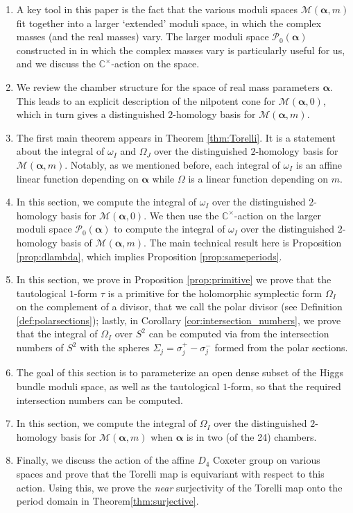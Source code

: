 \documentclass[12pt,letterpaper,reqno]{amsart}
\def\mathbf#1{#1}%
\theoremstyle{remark}
\theoremstyle{definition}
\numberwithin{thm}{section}
\numberwithin{equation}{section}
\numberwithin{figure}{section}
\newcommand{\C}{\ensuremath{\mathbb C}}
\newcommand{\bsa}{\boldsymbol{\alpha}}
\newcommand{\bfm}{\mathbf{m}}
\begin{document}
\begin{enumerate}
\item[\S\ref{sec:extended}]A key tool in this paper is the fact that the various moduli spaces $\mathcal{M}(\bsa, \bfm)$ fit together into a larger `extended' moduli space, in which the complex masses (and the real masses) vary.  The larger moduli space $\mathcal{P}_0(\bsa)$ constructed in \cite{collier2024conformallimitsparabolicslnchiggs} in which the complex masses vary is particularly useful for us, and we discuss the $\C^\times$-action on the space.
\item[\S\ref{sec:distinguished_basis}] We review the chamber structure for the space of real mass parameters $\bsa$. This leads to an explicit description of the nilpotent cone for $\mathcal{M}(\bsa, \mathbf{0})$, which in turn gives a distinguished $2$-homology basis for $\mathcal{M}(\bsa, \bfm)$.
\item[\S\ref{sec:Torelli}] The first main theorem appears in Theorem \ref{thm:Torelli}. It is a statement about the integral of $\omega_I$ and $\Omega_J$ over the distinguished $2$-homology basis for $\mathcal{M}(\bsa, \bfm)$. Notably, as we mentioned before, each integral of $\omega_I$ is an affine linear function depending on $\bsa$ while $\Omega$ is a linear function depending on $\bfm$. \item[\S\ref{sec:TorelliomegaI}] In this section, we compute the integral of $\omega_I$ over the distinguished $2$-homology basis for $\mathcal{M}(\bsa, \mathbf{0})$. We then use the $\C^\times$-action on the larger moduli space $\mathcal{P}_0(\bsa)$ to compute the integral of $\omega_I$ over the distinguished $2$-homology basis of $\mathcal{M}(\bsa, \bfm)$. The main technical result here is Proposition \ref{prop:dlambda}, which implies Proposition \ref{prop:sameperiods}.
\item[\S\ref{sec:integralasintersectionnumber}] In this section, we prove in Proposition \ref{prop:primitive} we prove that the tautological $1$-form $\tau$ is a primitive for the holomorphic symplectic form $\Omega_I$ on the complement of a divisor, that we call the polar divisor (see Definition \ref{def:polarsections}); lastly, in Corollary \ref{cor:intersection_numbers}, we prove that the integral of $\Omega_I$ over $S^2$ can be computed via from the intersection numbers of $S^2$ with the spheres $\Sigma_j = \sigma_j^+ - \sigma_j^-$ formed from the polar sections. 
\item[\S\ref{sec:concrete}] The goal of this section is to parameterize an open dense subset of the Higgs bundle moduli space, as well as the tautological $1$-form, so that the required intersection numbers can be computed. 
\item[\S\ref{sec:TorelliOmegaI}] In this section, we compute the integral of $\Omega_I$ over the distinguished $2$-homology basis for  $\mathcal{M}(\bsa, \mathbf{m})$ when $\bsa$ is in two (of the 24) chambers.  
\item[\S\ref{sec:Dehntwists}] Finally, we discuss the action of the affine $D_4$ Coxeter group on various spaces and prove that the Torelli map is equivariant with respect to this action. Using this, we prove the \emph{near} surjectivity of the Torelli map onto the period domain in Theorem\ref{thm:surjective}.
\end{enumerate}
\end{document}
